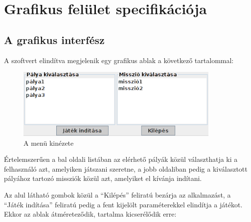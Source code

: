 %
\chapter{Grafikus felület specifikációja}

\thispagestyle{fancy}

\section{A grafikus interfész}
A szoftvert elindítva megjelenik egy grafikus ablak a következő tartalommal:

\begin{figure}[H]
\begin{center}
\includegraphics[width=10cm]{images/ch11/screenshot_menu.png}
\caption{A menü kinézete}
\label{fig:screenshot_menu}
\end{center}
\end{figure}

Értelemszerűen a bal oldali listában az elérhető pályák közül választhatja ki a felhasználó azt, amelyiken játszani szeretne, a jobb oldaliban pedig a kiválasztott pályához tartozó missziók közül azt, amelyiket el kívánja indítani.

Az alul látható gombok közül a ``Kilépés'' feliratú bezárja az alkalmazást, a ``Játék indítása'' feliratú pedig a fent kijelölt paraméterekkel elindítja a játékot. Ekkor az ablak átméreteződik, tartalma kicserélődik erre:

